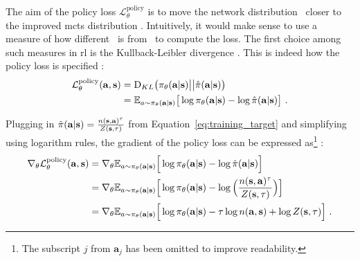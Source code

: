 The aim of the policy loss $\mathcal L^{\text{policy}}_\theta$ is to move the network distribution \p\ closer to the improved \gls{mcts} distribution \phat. Intuitively, it would make sense to use a measure of how different \p\ is from \phat\ to compute the loss. The first choice among such measures in \gls{rl} is the Kullback-Leibler divergence \cite{kullbackInformationSufficiency1951}. This is indeed how the policy loss is specified \cite{moerlandA0CAlphaZero2018}:
\begin{align}\label{eq:policy_loss_dkl}
\mathcal L^{\text{policy}}_\theta(\mathbf a, \mathbf s) & = \text{D}_{KL} \big( \p \big|\big| \phat  \big) \\ 
& = \E{a \sim \p} \big[ \log \p - \log \phat \big]~.
\end{align}

Plugging in $\phat = \frac{ n(\mathbf s, \mathbf a)^\tau }{ Z(\mathbf s, \tau) }$ from Equation~\ref{eq:training_target} and simplifying using logarithm rules, the gradient of the policy loss can be expressed as\footnote{The subscript $j$ from $\mathbf a_j$ has been omitted to improve readability.} \cite{moerlandA0CAlphaZero2018}:
\begin{align}\label{eq:policy_loss_gradient_w_target}
\nabla_\theta \mathcal L^{\text{policy}}_\theta(\mathbf a, \mathbf s) & = \nabla_\theta \E{a \sim \p} \Big[ \log \p - \log \phat \Big] \nonumber  \\
& = \nabla_\theta \E{a \sim \p} \Big[ \log \p - \log \Big( \frac{ n(\mathbf s , \mathbf a)^\tau }{ Z(\mathbf s, \tau) } \Big) \Big] \nonumber \\
& = \nabla_\theta \E{a \sim \p} \Big[ \log \p - \tau \log n(\mathbf a, \mathbf s) + \log Z(\mathbf s, \tau)  \Big]~.
\end{align}

